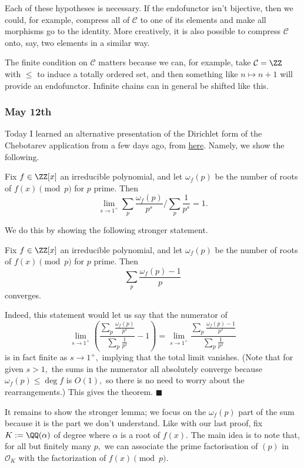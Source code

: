 Each of these hypotheses is necessary. If the endofunctor isn't bijective, then we could, for example, compress all of $\mathcal C$ to one of its elements and make all morphisms go to the identity. More creatively, it is also possible to compress $\mathcal C$ onto, say, two elements in a similar way.

The finite condition on $\mathcal C$ matters because we can, for example, take $\mathcal C=\ZZ$ with $\le$ to induce a totally ordered set, and then something like $n\mapsto n+1$ will provide an endofunctor. Infinite chains can in general be shifted like this.

\subsubsection{May 12th}
Today I learned an alternative presentation of the Dirichlet form of the Chebotarev application from a few days ago, from \href{https://web.archive.org/web/20180725092628/https://arxiv.org/pdf/1807.08899.pdf}{here}. Namely, we show the following.
\begin{theorem}
    Fix $f\in\ZZ[x]$ an irreducible polynomial, and let $\omega_f(p)$ be the number of roots of $f(x)\pmod p$ for $p$ prime. Then
    \[\lim_{s\to1^+}\sum_p\frac{\omega_f(p)}{p^s}\bigg/\sum_p\frac1{p^s}=1.\]
\end{theorem}
We do this by showing the following stronger statement.
\begin{lemma}
    Fix $f\in\ZZ[x]$ an irreducible polynomial, and let $\omega_f(p)$ be the number of roots of $f(x)\pmod p$ for $p$ prime. Then
    \[\sum_p\frac{\omega_f(p)-1}p\]
    converges.
\end{lemma}
Indeed, this statement would let us say that the numerator of
\[\lim_{s\to1^+}\left(\frac{\sum_p\frac{\omega_f(p)}{p^s}}{\sum_p\frac1{p^s}}-1\right)=\lim_{s\to1^+}\frac{\sum_p\frac{\omega_f(p)-1}{p^s}}{\sum_p\frac1{p^s}}\]
is in fact finite as $s\to1^+,$ implying that the total limit vanishes. (Note that for given $s>1,$ the sums in the numerator all absolutely converge because $\omega_f(p)\le\deg f$ is $O(1),$ so there is no need to worry about the rearrangements.) This gives the theorem. $\blacksquare$

It remains to show the stronger lemma; we focus on the $\omega_f(p)$ part of the sum because it is the part we don't understand. Like with our last proof, fix $K:=\QQ(\alpha)$ of degree where $\alpha$ is a root of $f(x).$ The main idea is to note that, for all but finitely many $p,$ we can associate the prime factorisation of $(p)$ in $\mathcal O_K$ with the factorization of $f(x)\pmod p.$

